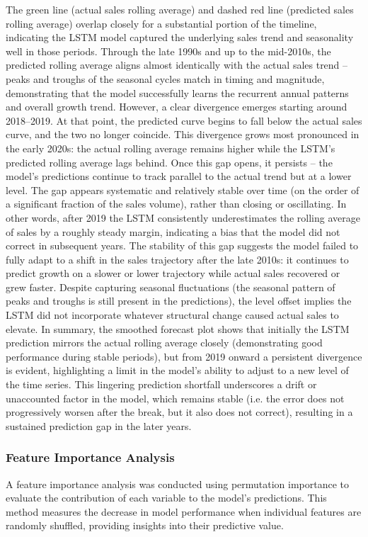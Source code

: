 \documentclass[12pt,a4paper]{report}
\begin{document}
The green line (actual sales rolling average) and dashed red line (predicted sales rolling average) overlap closely for a substantial portion of the timeline, indicating the LSTM model captured the underlying sales trend and seasonality well in those periods. Through the late 1990s and up to the mid-2010s, the predicted rolling average aligns almost identically with the actual sales trend – peaks and troughs of the seasonal cycles match in timing and magnitude, demonstrating that the model successfully learns the recurrent annual patterns and overall growth trend. However, a clear divergence emerges starting around 2018–2019. At that point, the predicted curve begins to fall below the actual sales curve, and the two no longer coincide. This divergence grows most pronounced in the early 2020s: the actual rolling average remains higher while the LSTM's predicted rolling average lags behind. Once this gap opens, it persists – the model's predictions continue to track parallel to the actual trend but at a lower level. The gap appears systematic and relatively stable over time (on the order of a significant fraction of the sales volume), rather than closing or oscillating. In other words, after 2019 the LSTM consistently underestimates the rolling average of sales by a roughly steady margin, indicating a bias that the model did not correct in subsequent years. The stability of this gap suggests the model failed to fully adapt to a shift in the sales trajectory after the late 2010s: it continues to predict growth on a slower or lower trajectory while actual sales recovered or grew faster. Despite capturing seasonal fluctuations (the seasonal pattern of peaks and troughs is still present in the predictions), the level offset implies the LSTM did not incorporate whatever structural change caused actual sales to elevate. In summary, the smoothed forecast plot shows that initially the LSTM prediction mirrors the actual rolling average closely (demonstrating good performance during stable periods), but from 2019 onward a persistent divergence is evident, highlighting a limit in the model's ability to adjust to a new level of the time series. This lingering prediction shortfall underscores a drift or unaccounted factor in the model, which remains stable (i.e. the error does not progressively worsen after the break, but it also does not correct), resulting in a sustained prediction gap in the later years.

\subsubsection{Feature Importance Analysis}
A feature importance analysis was conducted using permutation importance to evaluate the contribution of each variable to the model's predictions. This method measures the decrease in model performance when individual features are randomly shuffled, providing insights into their predictive value.
\end{document}
